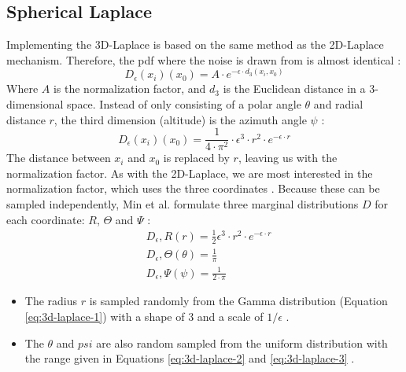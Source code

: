 \subsection{Spherical Laplace}
Implementing the 3D-Laplace is based on the same method as the 2D-Laplace mechanism.
Therefore, the \gls{pdf} where the noise is drawn from is almost identical \citep{9646489}:
\begin{equation}
  D_{\epsilon}(x_i)(x_0) = A \cdot e^{-\epsilon \cdot d_3(x_i, x_0)}
  \label{eq:3d-laplace-pdf}
\end{equation}
Where $A$ is the normalization factor, and $d_3$ is the Euclidean distance in a 3-dimensional space.
Instead of only consisting of a polar angle $\theta$ and radial distance $r$, the third dimension (altitude) is the azimuth angle $\psi$ \citep{9646489}:
\begin{equation}
  D_{\epsilon}(x_i)(x_0) = \frac{1}{4 \cdot \pi^2} \cdot \epsilon^3 \cdot r^2 \cdot e^{-\epsilon \cdot r}
  \label{eq:3d-laplace-with-normalization}
\end{equation}
The distance between $x_i$ and $x_0$ is replaced by $r$, leaving us with the normalization factor.
As with the 2D-Laplace, we are most interested in the normalization factor, which uses the three coordinates \citep{9646489}.
Because these can be sampled independently, Min et al. formulate three marginal distributions $D$ for each coordinate: $R$, $\Theta$ and $\Psi$ \citep{9646489}:
\begin{subequations}

  \begin{align}
     & D_\epsilon, R(r) = \frac{1}{2} \epsilon^3 \cdot r^2 \cdot e^{-\epsilon \cdot r} \label{eq:3d-laplace-1} \\
     & D_\epsilon, \Theta(\theta) = \frac{1}{\pi}                                      \label{eq:3d-laplace-2} \\
     & D_\epsilon, \Psi(\psi) = \frac{1}{2 \cdot \pi} \label{eq:3d-laplace-3}
  \end{align}
\end{subequations}
\begin{itemize}
  \item The radius $r$ is sampled randomly from the Gamma distribution (Equation \ref{eq:3d-laplace-1}) with a shape of 3 and a scale of $1/\epsilon$ \citep{9646489}.
  \item The $\theta$ and $psi$ are also random sampled from the uniform distribution with the range given in Equations \ref{eq:3d-laplace-2} and \ref{eq:3d-laplace-3} \citep{9646489}.
\end{itemize}
